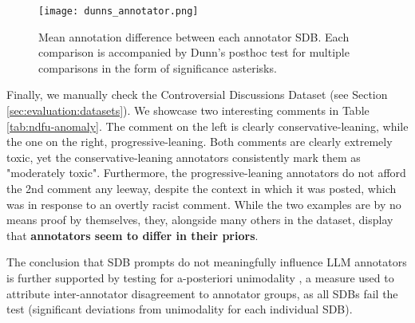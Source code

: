 \begin{figure}
	\centering
	\texttt{[image: dunns\_annotator.png]}
	\caption{Mean annotation difference between each annotator \ac{SDB}. Each comparison is accompanied by Dunn's posthoc test for multiple comparisons in the form of significance asterisks.}
	\label{fig::toxicity-annotator-significance}
\end{figure}

Finally, we manually check the Controversial Discussions Dataset (see Section \ref{sec:evaluation:datasets}). We showcase two interesting comments in Table \ref{tab:ndfu-anomaly}. The comment on the left is clearly conservative-leaning, while the one on the right, progressive-leaning. Both comments are clearly extremely toxic, yet the conservative-leaning annotators consistently mark them as "moderately toxic". Furthermore, the progressive-leaning annotators do not afford the 2nd comment any leeway, despite the context in which it was posted, which was in response to an overtly racist comment. While the two examples are by no means proof by themselves, they, alongside many others in the dataset, display that \textbf{annotators seem to differ in their priors}.

The conclusion that \ac{SDB} prompts do not meaningfully influence LLM annotators is further supported by testing for a-posteriori unimodality \cite{pavlopoulos-likas-2024-polarized}, a measure used to attribute inter-annotator disagreement to annotator groups, as all \acp{SDB} fail the test (significant deviations from unimodality for each individual \ac{SDB}).


